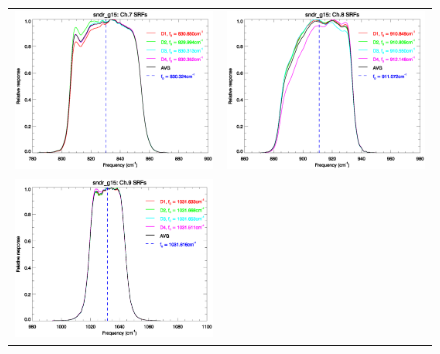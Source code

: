 \begin{figure}[htp]
  \centering
  \begin{tabular}{c c}
    \includegraphics[scale=0.5]{graphics/nominal/sndr_g15.ch7.srf.eps} &
    \includegraphics[scale=0.5]{graphics/nominal/sndr_g15.ch8.srf.eps} \\
    \includegraphics[scale=0.5]{graphics/nominal/sndr_g15.ch9.srf.eps} &

\end{tabular}
\end{figure}
